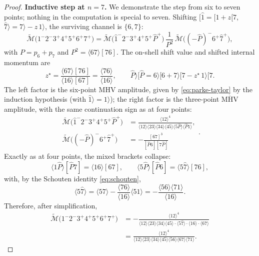 \begin{proof}
	\textbf{Inductive step at $n = 7$.} We demonstrate the step from six to seven points; nothing in the computation is special to seven. Shifting $[\hat 1 = [1 + z[7$, $\hat 7\rangle = 7\rangle - z\, 1\rangle$, the surviving channel is $\{6, 7\}$:
	\[
		\widetilde{\mathcal{M}}\big(1^- 2^- 3^+ 4^+ 5^+ 6^+ 7^+\big)
		= \widetilde{\mathcal{M}}\big(\hat 1^- 2^- 3^+ 4^+ 5^+ \hat P^+\big)\, \frac{1}{P^2}\, \widetilde{\mathcal{M}}\big((-\hat P)^- 6^+ \hat 7^+\big)
	,\]
	with $P = p_6 + p_7$ and $P^2 = \langle 67 \rangle [76]$. The on-shell shift value and shifted internal momentum are
	\[
		z^{\star} = \frac{\langle 67 \rangle [76]}{\langle 16 \rangle [67]} = \frac{\langle 76 \rangle}{\langle 16 \rangle},
		\qquad
		\hat P \rangle [\hat P = 6\rangle[6 + 7\rangle[7 - z^{\star}\, 1\rangle[7
	.\]
	The left factor is the six-point MHV amplitude, given by \eqref{eq:parke-taylor} by the induction hypothesis (with $\hat 1\rangle = 1\rangle$); the right factor is the three-point $\overline{\text{MHV}}$ amplitude, with the same continuation sign as at four points:
	\[
		\begin{aligned}
		\widetilde{\mathcal{M}}\big(\hat 1^- 2^- 3^+ 4^+ 5^+ \hat P^+\big)
		&= \frac{\langle 12 \rangle^4}{\langle 12 \rangle \langle 23 \rangle \langle 34 \rangle \langle 45 \rangle \langle 5 \hat P \rangle \langle \hat P 1 \rangle}, \\
		\widetilde{\mathcal{M}}\big((-\hat P)^- 6^+ \hat 7^+\big)
		&= -\frac{[67]^3}{[\hat P 6][7 \hat P]}
		\end{aligned}
	.\]
	Exactly as at four points, the mixed brackets collapse:
	\[
		\langle 1 \hat P \rangle [\hat P 7] = \langle 16 \rangle [67],
		\qquad
		\langle 5 \hat P \rangle [\hat P 6] = \langle 5 \hat 7 \rangle [76],
	\]
	with, by the Schouten identity \eqref{eq:schouten},
	\[
		\langle 5 \hat 7 \rangle = \langle 57 \rangle - \frac{\langle 76 \rangle}{\langle 16 \rangle} \langle 51 \rangle
		= -\frac{\langle 56 \rangle \langle 71 \rangle}{\langle 16 \rangle}
	.\]
	Therefore, after simplification,
	\begin{align*}
		\widetilde{\mathcal{M}}\big(1^- 2^- 3^+ 4^+ 5^+ 6^+ 7^+\big)
		&= -\frac{\langle 12 \rangle^4}{\langle 12 \rangle \langle 23 \rangle \langle 34 \rangle \langle 45 \rangle \cdot \langle 5 \hat 7 \rangle \cdot \langle 16 \rangle \cdot \langle 67 \rangle} \\
		&= \frac{\langle 12 \rangle^4}{\langle 12 \rangle \langle 23 \rangle \langle 34 \rangle \langle 45 \rangle \langle 56 \rangle \langle 67 \rangle \langle 71 \rangle}
	.\end{align*}
\end{proof}

